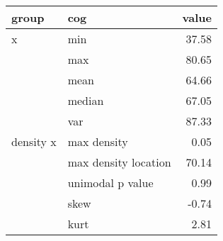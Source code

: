 \begin{tabular}{llr}
  \toprule
 group & cog & value \\ 
  \midrule
   x & min & 37.58 \\ 
    & max & 80.65 \\ 
    & mean & 64.66 \\ 
    & median & 67.05 \\ 
  \bigskip  & var & 87.33 \\ 
   density x & max density & 0.05 \\ 
    & max density location & 70.14 \\ 
    & unimodal p value & 0.99 \\ 
    & skew & -0.74 \\ 
    & kurt & 2.81 \\ 
   \bottomrule
\end{tabular}
